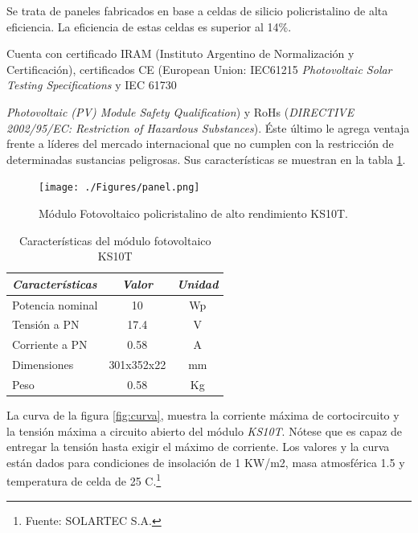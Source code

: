 Se trata de paneles fabricados en base a celdas de silicio policristalino de alta eficiencia. La eficiencia de estas celdas es superior al 14\%.

Cuenta con certificado IRAM (Instituto Argentino de Normalización y Certificación), certificados CE (European Union: IEC61215 \textit{Photovoltaic Solar Testing Specifications} y IEC 61730 {\textit{Photovoltaic (PV) Module Safety Qualification}) y RoHs (\textit{DIRECTIVE 2002/95/EC: Restriction of Hazardous Substances}). Éste último le agrega ventaja frente a líderes del mercado internacional que no cumplen con la restricción de determinadas sustancias peligrosas. Sus características se muestran en la tabla \ref{tab:ks10t}. 

 \begin{figure}[h!]
	\centering
    \texttt{[image: ./Figures/panel.png]}
    	\caption{Módulo Fotovoltaico policristalino de alto rendimiento KS10T.}
	\label{fig:ks10t}
\end{figure}

\vspace{10px}

\begin{table}[ht]
	\centering
	\caption{Características del módulo fotovoltaico KS10T}
	\begin{tabular}{@{} l *2c @{}}    \toprule
		\emph{\textbf{Características}} & \emph{\textbf{Valor}} & \emph{\textbf{Unidad}}\\
		\midrule
		Potencia nominal	& 10 	& Wp	\\	
		Tensión a PN		& 17.4	& V\\
		Corriente a PN	& 0.58		& A\\
		Dimensiones		& 301x352x22 	& mm\\
		Peso				& 0.58		& Kg	\\
		\bottomrule
		\hline
	\end{tabular}
	\label{tab:ks10t}
\end{table}

La curva de la figura \ref{fig:curva}, muestra la corriente máxima de cortocircuito y la tensión máxima a circuito abierto del módulo \textit{KS10T}. Nótese que es capaz de entregar la tensión hasta exigir el máximo de corriente. Los valores y la curva están dados para condiciones de insolación de 1 KW/m2, masa atmosférica 1.5 y temperatura de celda de 25 \grados C.\footnote{Fuente: SOLARTEC S.A.}

}
